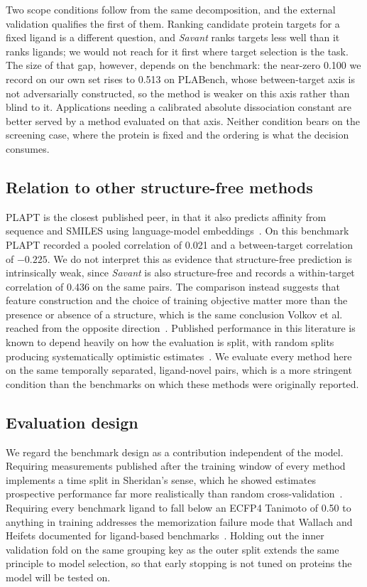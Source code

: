 \documentclass[times, twoside]{zHenriquesLab-StyleBioRxiv}
\newcommand{\savant}{\textit{Savant}\xspace}
\begin{document}
Two scope conditions follow from the same decomposition, and the external validation qualifies the first of them. Ranking candidate protein targets for a fixed ligand is a different question, and \savant ranks targets less well than it ranks ligands; we would not reach for it first where target selection is the task. The size of that gap, however, depends on the benchmark: the near-zero 0.100 we record on our own set rises to 0.513 on PLABench, whose between-target axis is not adversarially constructed, so the method is weaker on this axis rather than blind to it. Applications needing a calibrated absolute dissociation constant are better served by a method evaluated on that axis. Neither condition bears on the screening case, where the protein is fixed and the ordering is what the decision consumes.

\subsection*{Relation to other structure-free methods}

PLAPT is the closest published peer, in that it also predicts affinity from sequence and SMILES using language-model embeddings~\cite{rose2024plapt}. On this benchmark PLAPT recorded a pooled correlation of 0.021 and a between-target correlation of $-0.225$. We do not interpret this as evidence that structure-free prediction is intrinsically weak, since \savant is also structure-free and records a within-target correlation of 0.436 on the same pairs. The comparison instead suggests that feature construction and the choice of training objective matter more than the presence or absence of a structure, which is the same conclusion Volkov et al. reached from the opposite direction~\cite{volkov2022frustration}. Published performance in this literature is known to depend heavily on how the evaluation is split, with random splits producing systematically optimistic estimates~\cite{sheridan2013timesplit,wallach2018memorization}. We evaluate every method here on the same temporally separated, ligand-novel pairs, which is a more stringent condition than the benchmarks on which these methods were originally reported.

\subsection*{Evaluation design}

We regard the benchmark design as a contribution independent of the model. Requiring measurements published after the training window of every method implements a time split in Sheridan's sense, which he showed estimates prospective performance far more realistically than random cross-validation~\cite{sheridan2013timesplit}. Requiring every benchmark ligand to fall below an ECFP4 Tanimoto of 0.50 to anything in training addresses the memorization failure mode that Wallach and Heifets documented for ligand-based benchmarks~\cite{wallach2018memorization}. Holding out the inner validation fold on the same grouping key as the outer split extends the same principle to model selection, so that early stopping is not tuned on proteins the model will be tested on.
\end{document}
